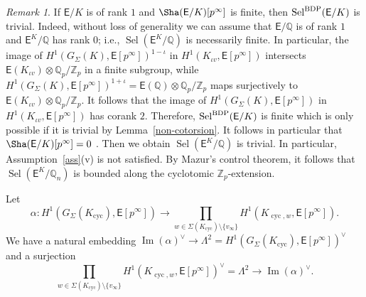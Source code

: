 \documentclass{amsart}
\numberwithin{equation}{section}
\theoremstyle{remark}
\newtheorem{remark}[theorem]{Remark}
\newcommand{\Image}{\operatorname{Im}}
\newcommand{\cyc}{\operatorname{cyc}}
\newcommand{\Sel}{\operatorname{Sel}}
\newcommand{\SelBDP}{\operatorname{Sel}^{\textup{BDP}}}
\newcommand{\Z}{\mathbb{Z}}
\newcommand{\Q}{\mathbb{Q}}
\newcommand{\EC}{\mathsf{E}}
\theoremstyle{plain} %
\begin{document}
\begin{remark}
\label{rank1-case}
If $\EC/K$ is of rank $1$ and $\Sha(\EC/K){[p^\infty]}$ is finite, then $\SelBDP(\EC/K)$ is trivial.
Indeed, without loss of generality we can assume that $\EC/\Q$ is of rank $1$ and $\EC^K/\Q$ has rank 0; i.e., $\Sel(\EC^K/\Q)$ is necessarily finite.
In particular, the image of  $H^1(G_\Sigma(K),\EC[p^\infty])^{1-\iota}$ in $H^1(K_{\iota v},\EC[p^\infty])$ intersects $\EC(K_{\iota v})\otimes \Q_p/\Z_p$ in a finite subgroup, while $H^1(G_\Sigma(K),\EC[p^\infty])^{1+\iota}=\EC(\Q)\otimes \Q_p/\Z_p$ maps surjectively to $\EC(K_{\iota v})\otimes \Q_p/\Z_p$.
It follows that the image of $H^1(G_\Sigma(K),\EC[p^\infty])$ in $H^1(K_{\iota v},\EC[p^\infty])$ has corank $2$.
Therefore, $\SelBDP(\EC/K)$ is finite which is only possible if it is trivial by Lemma~\ref{non-cotorsion}.
It follows in particular that $\Sha(\EC/K)[p^\infty]=0$ \cite[Section 6.2]{skinner}.
Then we obtain $\Sel(\EC^K/\Q)$ is trivial.
In particular, Assumption~\ref{ass}(v) is not satisfied.
{By Mazur's control theorem, it follows that $\Sel(\EC^K/\Q_n)$ is bounded along the cyclotomic $\Z_p$-extension.}
\end{remark}

Let
\[
\alpha \colon H^1(G_\Sigma(K_{\cyc}),\EC[p^\infty])\longrightarrow \prod_{w\in \Sigma(K_{\cyc})\setminus\{v_\infty\}}H^1(K_{\cyc,w},\EC[p^\infty]).
\]
We have a natural embedding $\Image(\alpha)^\vee\to \Lambda^2=H^1(G_\Sigma(K_{\cyc}),\EC[p^\infty])^\vee$ and a surjection 
\[
\prod_{w\in \Sigma(K_{\cyc})\setminus\{v_\infty\}}H^1(K_{\cyc,w},\EC[p^\infty])^\vee=\Lambda^2\longrightarrow \Image(\alpha)^\vee.
\]
\end{document}

